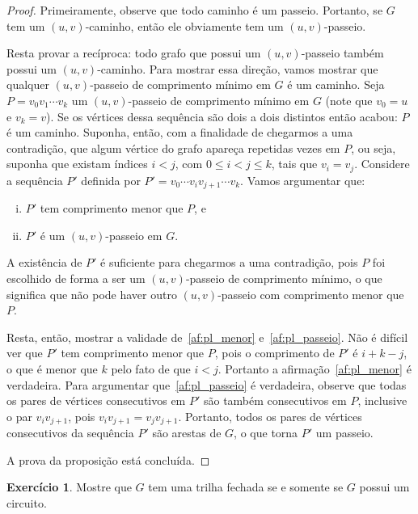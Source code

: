 \documentclass[12pt, a4paper]{article}
\theoremstyle{definition}
\newtheorem{exer}{Exercício}
\begin{document}
\begin{proof}
Primeiramente, observe que todo caminho é um passeio. Portanto, se $G$ tem um $(u,v)$-caminho, então ele obviamente tem um $(u,v)$-passeio.

Resta provar a recíproca: todo grafo que possui um $(u,v)$-passeio também possui um $(u,v)$-caminho. Para mostrar essa direção, vamos mostrar que qualquer $(u,v)$-passeio de comprimento mínimo em $G$ é um caminho. Seja $P = v_0v_1 \cdots v_k$ um $(u,v)$-passeio de comprimento mínimo em $G$ (note que $v_0 = u$ e $v_k = v$). Se os vértices dessa sequência são dois a dois distintos então acabou: $P$ é um caminho. Suponha, então, com a finalidade de chegarmos a uma contradição, que algum vértice do grafo apareça repetidas vezes em $P$, ou seja, suponha que existam índices $i < j$, com $0 \leq i < j \leq k$, tais que $v_i = v_j$. 
Considere a sequência $P'$ definida por $P' = v_0 \cdots v_i v_{j+1} \cdots v_k$. Vamos argumentar que:
\begin{enumerate}[(i)]
    \item \label{af:pl_menor} $P'$ tem comprimento menor que $P$, e
    \item \label{af:pl_passeio} $P'$ é um $(u,v)$-passeio em $G$.
\end{enumerate}
A existência de $P'$ é suficiente para chegarmos a uma contradição, pois $P$ foi escolhido de forma a ser um $(u,v)$-passeio de comprimento mínimo, o que significa que não pode haver outro $(u,v)$-passeio com comprimento menor que~$P$.

Resta, então, mostrar a validade de~\eqref{af:pl_menor} e~\eqref{af:pl_passeio}. Não é difícil ver que $P'$ tem comprimento menor que $P$, pois o comprimento de $P'$ é $i + k - j$, o que é menor que $k$ pelo fato de que $i < j$. Portanto a afirmação~\eqref{af:pl_menor} é verdadeira. Para argumentar que~\eqref{af:pl_passeio} é verdadeira, observe que todas os pares de vértices consecutivos em $P'$ são também consecutivos em $P$, inclusive o par $v_i v_{j+1}$, pois $v_i v_{j+1} = v_j v_{j+1}$. Portanto, todos os pares de vértices consecutivos da sequência $P'$ são arestas de $G$, o que torna $P'$ um passeio.

A prova da proposição está concluída.
\end{proof}

\begin{exer}
Mostre que $G$ tem uma trilha fechada se e somente se $G$ possui um circuito.
\end{exer}
\end{document}
